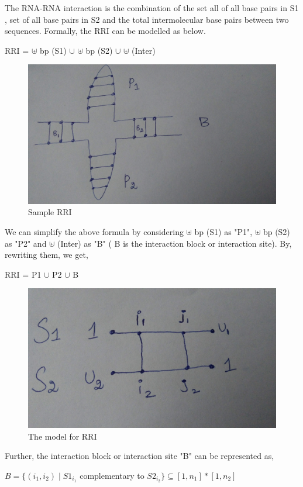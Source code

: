 \documentclass[twoside,a4paper]{report}
\begin{document}
 	The RNA-RNA interaction is the combination of the set all of all base pairs in S1 , set of all base pairs in S2 and the total intermolecular base pairs between two sequences. Formally, the RRI can be modelled as below.

 	\begin{center}
 		 RRI = $ \uplus $ bp (S1) $ \cup $ $\uplus$ bp (S2) $\cup$ $\uplus$ (Inter)
 	\end{center}
 
	 	\begin{figure}[H]
		\includegraphics[width=0.6\linewidth]{RRI2}
		\centering
		\caption{Sample RRI }
		\label{fig:RRI2}
	\end{figure}
	
 	We can simplify the above formula by considering  $ \uplus $ bp (S1) as "P1", $\uplus$ bp (S2) as "P2" and $\uplus$ (Inter) as "B" ( B is the interaction block or interaction site). By, rewriting them, we get, 
 	
 	\begin{center}
 		RRI =  P1 $ \cup $  P2 $\cup$ B
 	\end{center}
 
 	\begin{figure}[H]
 		\includegraphics[width=0.6\linewidth]{RRI}
 		\centering
 		\caption{The model for RRI }
 		\label{fig:RRI}
 	\end{figure}
 
 	Further, the interaction block or interaction site "B" can be represented as,
 	
 	\begin{center}
 	 $B = \{ (i_1 , i_2)  \mid  S1_{i_1}$ complementary to $ S2_{i_2} \} \subseteq [ 1, n_1] * [1 , n_2] $
 	\end{center}
 	
\end{document}
